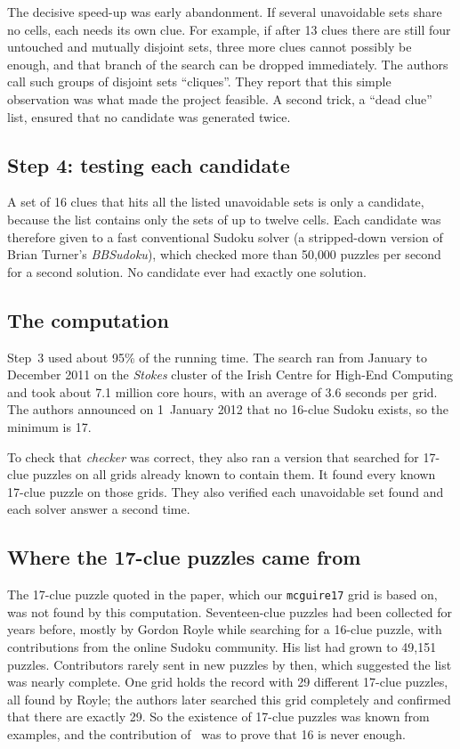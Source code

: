 \documentclass[11pt]{article}
\begin{document}
The decisive speed-up was early abandonment. If several unavoidable sets share no cells, each needs its own clue. For example, if after 13 clues there are still four untouched and mutually disjoint sets, three more clues cannot possibly be enough, and that branch of the search can be dropped immediately. The authors call such groups of disjoint sets ``cliques''. They report that this simple observation was what made the project feasible. A second trick, a ``dead clue'' list, ensured that no candidate was generated twice.

\subsection*{Step 4: testing each candidate}

A set of 16 clues that hits all the listed unavoidable sets is only a candidate, because the list contains only the sets of up to twelve cells. Each candidate was therefore given to a fast conventional Sudoku solver (a stripped-down version of Brian Turner's \emph{BBSudoku}), which checked more than 50{,}000 puzzles per second for a second solution. No candidate ever had exactly one solution.

\subsection*{The computation}

Step~3 used about 95\% of the running time. The search ran from January to December 2011 on the \emph{Stokes} cluster of the Irish Centre for High-End Computing and took about 7.1 million core hours, with an average of 3.6 seconds per grid. The authors announced on 1~January 2012 that no 16-clue Sudoku exists, so the minimum is 17.

To check that \emph{checker} was correct, they also ran a version that searched for 17-clue puzzles on all grids already known to contain them. It found every known 17-clue puzzle on those grids. They also verified each unavoidable set found and each solver answer a second time.

\subsection*{Where the 17-clue puzzles came from}

The 17-clue puzzle quoted in the paper, which our \texttt{mcguire17} grid is based on, was not found by this computation. Seventeen-clue puzzles had been collected for years before, mostly by Gordon Royle while searching for a 16-clue puzzle, with contributions from the online Sudoku community. His list had grown to 49{,}151 puzzles. Contributors rarely sent in new puzzles by then, which suggested the list was nearly complete. One grid holds the record with 29 different 17-clue puzzles, all found by Royle; the authors later searched this grid completely and confirmed that there are exactly 29. So the existence of 17-clue puzzles was known from examples, and the contribution of~\cite{mcguire} was to prove that 16 is never enough.
\end{document}
